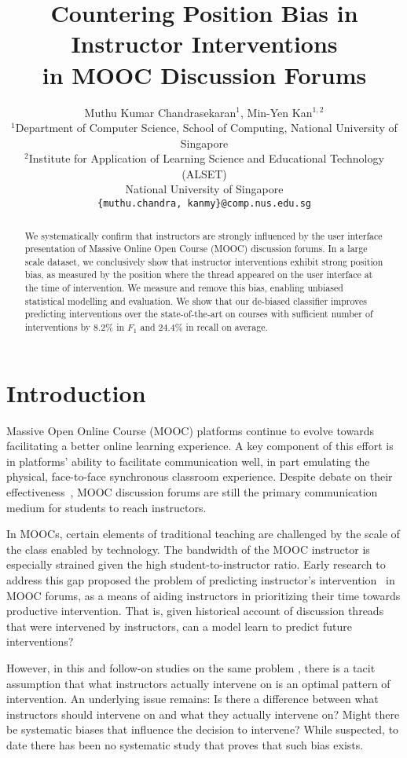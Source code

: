 \documentclass[11pt,a4paper]{article}
\title{Countering Position Bias in Instructor Interventions\\
in MOOC Discussion Forums}
\author{Muthu Kumar Chandrasekaran$^1$, 
  Min-Yen Kan$^{1,2}$\\
  $^1$Department of Computer Science,
  School of Computing, 
  National University of Singapore \\
  $^2$Institute for Application of Learning Science and Educational Technology (ALSET) \\
  National University of Singapore\\
  {\tt \{muthu.chandra, kanmy\}@comp.nus.edu.sg} }
\date{}
\begin{document}
\maketitle
\begin{abstract}
 We systematically confirm that instructors are strongly influenced by
the user interface presentation of Massive Online Open Course (MOOC)
discussion forums. In a large scale dataset, we conclusively show that
instructor interventions exhibit strong position bias, as measured by
the position where the thread appeared on the user interface at the
time of intervention.  We measure and remove this bias, enabling
unbiased statistical modelling and evaluation. We show that our
de-biased classifier improves predicting interventions over the
state-of-the-art on courses with sufficient number of interventions by
8.2\% in $F_1$ and 24.4\% in recall on average.
\end{abstract}

\section{Introduction}
\label{sect:intro}
Massive Open Online Course (MOOC) platforms continue to evolve towards
facilitating a better online learning experience.  A key component of
this effort is in platforms' ability to facilitate communication well,
in part emulating the physical, face-to-face synchronous classroom
experience.  Despite debate on their
effectiveness~\cite{onah2014,mak2010}, MOOC discussion forums are
still the primary communication medium for students to reach
instructors.

In MOOCs, certain elements of traditional teaching are challenged by
the scale of the class enabled by technology. The bandwidth of the
MOOC instructor is especially strained given the high
student-to-instructor ratio.  Early research to address this gap
proposed the problem of predicting instructor's
intervention~\cite{chaturvedi2014} in MOOC forums, as a means of
aiding instructors in prioritizing their time towards productive
intervention.
 That is, given historical account of discussion threads
that were intervened by instructors, can a model learn to predict
future interventions?

However, in this and follow-on studies on the same problem
\cite{chandrasekaran2015}, there is a tacit assumption that what
instructors actually intervene on is an optimal pattern of
intervention.
An underlying issue remains: Is there a difference between what
instructors should intervene on and what they actually intervene on?
Might there be systematic biases that influence the decision to
intervene?  While suspected, to date there has been no systematic
study that proves that such bias exists.
\end{document}
